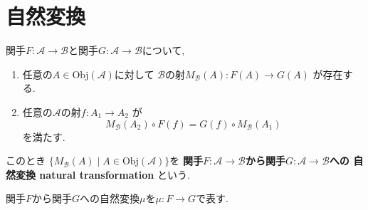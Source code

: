 \section{自然変換}
\begin{Def}
関手$F:\mathscr{A}\rightarrow\mathscr{B}$と関手$G:\mathscr{A}\rightarrow\mathscr{B}$について,
\begin{enumerate}
\item 任意の$A\in\mathrm{Obj}(\mathscr{A})$に対して
$\mathscr{B}$の射$M_{\mathscr{B}}(A):F(A)\rightarrow G(A)$
が存在する.
\item 任意の$\mathscr{A}$の射$f:A_1\rightarrow A_2$
が
\[
M_{\mathscr{B}}(A_2)\circ F(f)
=G(f)\circ M_{\mathscr{B}}(A_1)
\]
を満たす.
\end{enumerate}
このとき
$\{M_{\mathscr{B}}(A)\mid A\in\mathrm{Obj}(\mathscr{A})\}$を
{\bf 関手$F:\mathscr{A}\rightarrow\mathscr{B}$から関手$G:\mathscr{A}\rightarrow\mathscr{B}$への
自然変換 natural transformation
}という.
\end{Def}
\begin{Notation}
関手$F$から関手$G$への自然変換$\mu$を$\mu:F\rightarrow G$で表す.
\end{Notation}
\begin{comment}
\begin{Notation}
関手$F$から関手$G$への自然変換$\alpha$を次の図表で表す.
\end{Notation}
\end{comment}
\begin{comment}
\section{Haskにおける自然変換}
\subsection{concat}
\subsection{List関手からMaybe関手への自然変換safehead}
\subsection{concatとsafeheadの垂直合成}
\subsection{二分木からリストへのflatten関数}

\section{Haskにおける定数関手}
\subsection{length関数}
\end{comment}


